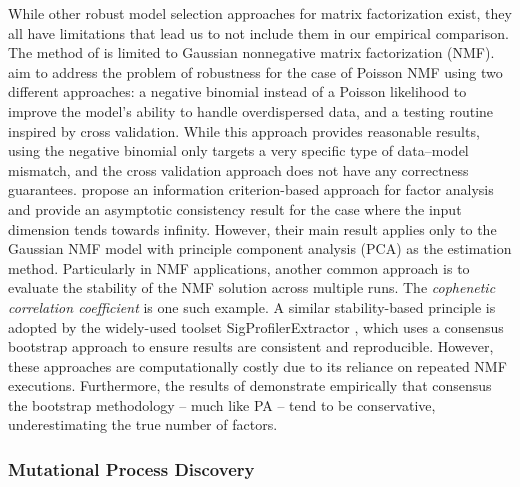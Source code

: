 While other robust model selection approaches for matrix factorization exist, they all have limitations
that lead us to not include them in our empirical comparison. 
The method of \citet{Liu_Support-Union_2019} is limited to Gaussian nonnegative matrix factorization (NMF).
\citet{Pelizzola_NegBin-NMF_2023} aim to address the problem of robustness for the case of 
Poisson NMF using two different approaches: a negative binomial instead of a Poisson likelihood to improve the model's ability to handle overdispersed data, and a testing routine inspired by cross validation.
While this approach provides reasonable results, using the negative binomial only targets a very specific type of data--model mismatch, and the cross validation approach does not have any correctness guarantees.
\citet{Bai_DeterminingNumberFactors_2002} propose an information criterion-based approach for factor analysis
and provide an asymptotic consistency result for the case where the input dimension tends towards infinity. 
However, their main result
applies only to the Gaussian NMF model with principle component analysis (PCA) as the estimation method.
Particularly in NMF applications, another common approach is to evaluate the stability of the 
NMF solution across multiple runs. 
The \emph{cophenetic correlation coefficient} \citep{brunet_CCC_2004a} is one such example. 
A similar stability-based principle is adopted by the widely-used toolset SigProfilerExtractor \citep{islam_sigprofiler_extractor_2022}, which uses a consensus bootstrap approach to ensure results are consistent and reproducible. 
However, these approaches are computationally costly due to its reliance on repeated NMF executions. Furthermore, the results of \citet{Xue:2024} demonstrate empirically that consensus the bootstrap methodology -- much like PA -- tend to be conservative, underestimating the true number of factors. 

\subsubsection{Mutational Process Discovery} \label{sec:mutsigs}

